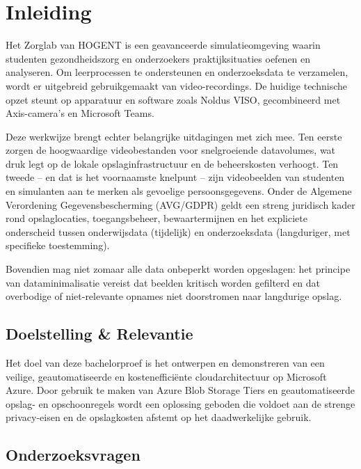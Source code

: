 
\chapter{Inleiding}%
\label{sec:bp_inleiding}

Het Zorglab van HOGENT is een geavanceerde simulatieomgeving waarin studenten gezondheidszorg en onderzoekers praktijksituaties oefenen en analyseren. Om leerprocessen te ondersteunen en onderzoeksdata te verzamelen, wordt er uitgebreid gebruikgemaakt van video-recordings. De huidige technische opzet steunt op apparatuur en software zoals Noldus VISO, gecombineerd met Axis-camera’s en Microsoft Teams.

Deze werkwijze brengt echter belangrijke uitdagingen met zich mee. Ten eerste zorgen de hoogwaardige videobestanden voor snelgroeiende datavolumes, wat druk legt op de lokale opslaginfrastructuur en de beheerskosten verhoogt. Ten tweede – en dat is het voornaamste knelpunt – zijn videobeelden van studenten en simulanten aan te merken als gevoelige persoonsgegevens. Onder de Algemene Verordening Gegevensbescherming (AVG/GDPR) geldt een streng juridisch kader rond opslaglocaties, toegangsbeheer, bewaartermijnen en het expliciete onderscheid tussen onderwijsdata (tijdelijk) en onderzoeksdata (langduriger, met specifieke toestemming).

Bovendien mag niet zomaar alle data onbeperkt worden opgeslagen: het principe van dataminimalisatie vereist dat beelden kritisch worden gefilterd en dat overbodige of niet-relevante opnames niet doorstromen naar langdurige opslag.

\section{Doelstelling \& Relevantie}%
\label{subsec:bp_doelstelling}

Het doel van deze bachelorproef is het ontwerpen en demonstreren van een veilige, geautomatiseerde en kostenefficiënte cloudarchitectuur op Microsoft Azure. Door gebruik te maken van Azure Blob Storage Tiers en geautomatiseerde opslag- en opschoonregels wordt een oplossing geboden die voldoet aan de strenge privacy-eisen en de opslagkosten afstemt op het daadwerkelijke gebruik.

\section{Onderzoeksvragen}%
\label{subsec:bp_onderzoeksvragen}

